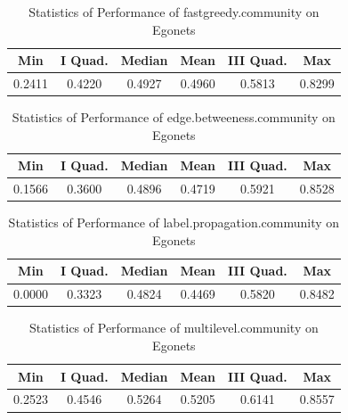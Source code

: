 \begin{table}[!h]
\renewcommand{\arraystretch}{1.3}
\caption{Statistics of Performance of fastgreedy.community on Egonets}
\label{table}
\centering
\begin{tabular}{|c|c|c|c|c|c|}
  \hline
\multicolumn{1}{|c|}{\textbf{Min}} & \multicolumn{1}{c|}{\textbf{I Quad.}} & \multicolumn{1}{c|}{\textbf{Median}} & \multicolumn{1}{c|}{\textbf{Mean}} & \multicolumn{1}{c|}{\textbf{III Quad.}} & \multicolumn{1}{c|}{\textbf{Max}}        \\
  \hline
  0.2411 & 0.4220 & 0.4927 & 0.4960 & 0.5813 & 0.8299\\
   \hline
\end{tabular}
\end{table}

\begin{table}[!h]
\renewcommand{\arraystretch}{1.3}
\caption{Statistics of Performance of edge.betweeness.community on Egonets}
\label{table}
\centering
\begin{tabular}{|c|c|c|c|c|c|}
  \hline
\multicolumn{1}{|c|}{\textbf{Min}} & \multicolumn{1}{c|}{\textbf{I Quad.}} & \multicolumn{1}{c|}{\textbf{Median}} & \multicolumn{1}{c|}{\textbf{Mean}} & \multicolumn{1}{c|}{\textbf{III Quad.}} & \multicolumn{1}{c|}{\textbf{Max}}        \\
  \hline
  0.1566 & 0.3600 & 0.4896 & 0.4719 & 0.5921 & 0.8528\\
   \hline
\end{tabular}
\end{table}

\begin{table}[!h]
\renewcommand{\arraystretch}{1.3}
\caption{Statistics of Performance of label.propagation.community on Egonets}
\label{table}
\centering
\begin{tabular}{|c|c|c|c|c|c|}
  \hline
\multicolumn{1}{|c|}{\textbf{Min}} & \multicolumn{1}{c|}{\textbf{I Quad.}} & \multicolumn{1}{c|}{\textbf{Median}} & \multicolumn{1}{c|}{\textbf{Mean}} & \multicolumn{1}{c|}{\textbf{III Quad.}} & \multicolumn{1}{c|}{\textbf{Max}}        \\
  \hline
  0.0000 & 0.3323 & 0.4824 & 0.4469 & 0.5820 & 0.8482\\
   \hline
\end{tabular}
\end{table}

\begin{table}[!h]
\renewcommand{\arraystretch}{1.3}
\caption{Statistics of Performance of multilevel.community on Egonets}
\label{table}
\centering
\begin{tabular}{|c|c|c|c|c|c|}
  \hline
\multicolumn{1}{|c|}{\textbf{Min}} & \multicolumn{1}{c|}{\textbf{I Quad.}} & \multicolumn{1}{c|}{\textbf{Median}} & \multicolumn{1}{c|}{\textbf{Mean}} & \multicolumn{1}{c|}{\textbf{III Quad.}} & \multicolumn{1}{c|}{\textbf{Max}}        \\
  \hline
  0.2523 & 0.4546 & 0.5264 & 0.5205 & 0.6141 & 0.8557\\
   \hline
\end{tabular}
\end{table}

